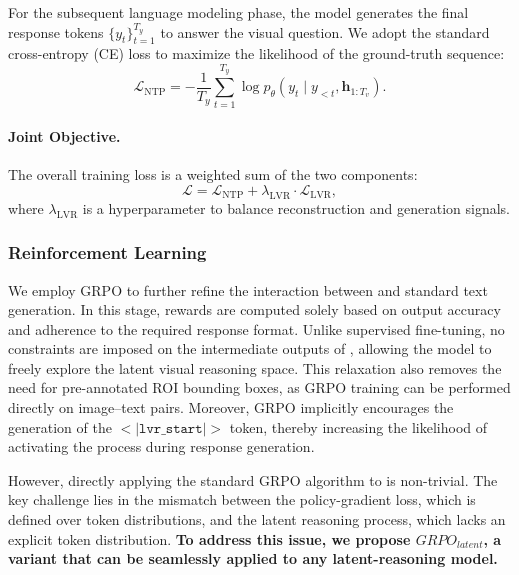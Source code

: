 For the subsequent language modeling phase, the model generates the final response tokens $\{ y_t \}_{t=1}^{T_y}$ to answer the visual question.  
We adopt the standard cross-entropy (CE) loss to maximize the likelihood of the ground-truth sequence:
\begin{equation}
\mathcal{L}_{\mathrm{NTP}}
= - \frac{1}{T_y} \sum_{t=1}^{T_y} 
\log p_\theta\!\left( y_t \mid y_{<t}, \mathbf{h}_{1:T_v} \right).
\end{equation}

\paragraph{Joint Objective.}  
The overall training loss is a weighted sum of the two components:
\begin{equation}
\mathcal{L} =  \mathcal{L}_{\mathrm{NTP}} + \lambda_{\mathrm{LVR}} \cdot \mathcal{L}_{\mathrm{LVR}},
\end{equation}
where $\lambda_{\mathrm{LVR}}$ is a hyperparameter to balance reconstruction and generation signals.

\subsubsection{Reinforcement Learning}
We employ GRPO to further refine the interaction between \modelname and standard text generation. In this stage, rewards are computed solely based on output accuracy and adherence to the required response format. Unlike supervised fine-tuning, no constraints are imposed on the intermediate outputs of \modelname, allowing the model to freely explore the latent visual reasoning space. This relaxation also removes the need for pre-annotated ROI bounding boxes, as GRPO training can be performed directly on image–text pairs. Moreover, GRPO implicitly encourages the generation of the $<\vert\texttt{lvr\_start}\vert>$ token, thereby increasing the likelihood of activating the \modelname process during response generation.


However, directly applying the standard GRPO algorithm to \modelname is non-trivial. The key challenge lies in the mismatch between the policy-gradient loss, which is defined over token distributions, and the latent reasoning process, which lacks an explicit token distribution. \textbf{To address this issue, we propose $GRPO_{{latent}}$, a variant that can be seamlessly applied to any latent-reasoning model.}

